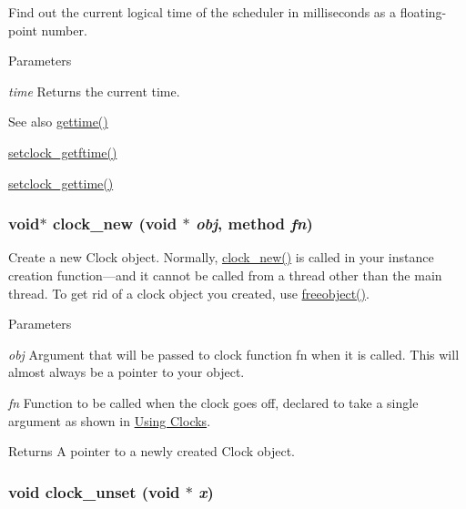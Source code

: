 Find out the current logical time of the scheduler in milliseconds as a floating-\/point number. 
\begin{DoxyParams}{Parameters}
\item[{\em time}]Returns the current time. \end{DoxyParams}
\begin{DoxySeeAlso}{See also}
\hyperlink{group__clocks_gabe5d8b1c9f260d13734a328b2a60ff69}{gettime()} 

\hyperlink{group__clocks_gafd1993dc69a6232cf28683961c97b9e4}{setclock\_\-getftime()} 

\hyperlink{group__clocks_ga1322ff3659b3d754298c636ad1856903}{setclock\_\-gettime()} 
\end{DoxySeeAlso}
\hypertarget{group__clocks_ga6257ddd41904756699208f135f6539fd}{
\subsubsection[{clock\_\-new}]{\setlength{\rightskip}{0pt plus 5cm}void$\ast$ clock\_\-new (void $\ast$ {\em obj}, \/  {\bf method} {\em fn})}}
\label{group__clocks_ga6257ddd41904756699208f135f6539fd}


Create a new Clock object. Normally, \hyperlink{group__clocks_ga6257ddd41904756699208f135f6539fd}{clock\_\-new()} is called in your instance creation function—and it cannot be called from a thread other than the main thread. To get rid of a clock object you created, use \hyperlink{group__class__old_gadf30646e52376a37b93cc20efac65636}{freeobject()}.


\begin{DoxyParams}{Parameters}
\item[{\em obj}]Argument that will be passed to clock function fn when it is called. This will almost always be a pointer to your object. \item[{\em fn}]Function to be called when the clock goes off, declared to take a single argument as shown in \hyperlink{group__clocks_clocks_using_clocks}{Using Clocks}. \end{DoxyParams}
\begin{DoxyReturn}{Returns}
A pointer to a newly created Clock object. 
\end{DoxyReturn}
\hypertarget{group__clocks_ga64f5f8a027b39c1c14464744a9cc08ce}{
\subsubsection[{clock\_\-unset}]{\setlength{\rightskip}{0pt plus 5cm}void clock\_\-unset (void $\ast$ {\em x})}}
\label{group__clocks_ga64f5f8a027b39c1c14464744a9cc08ce}


